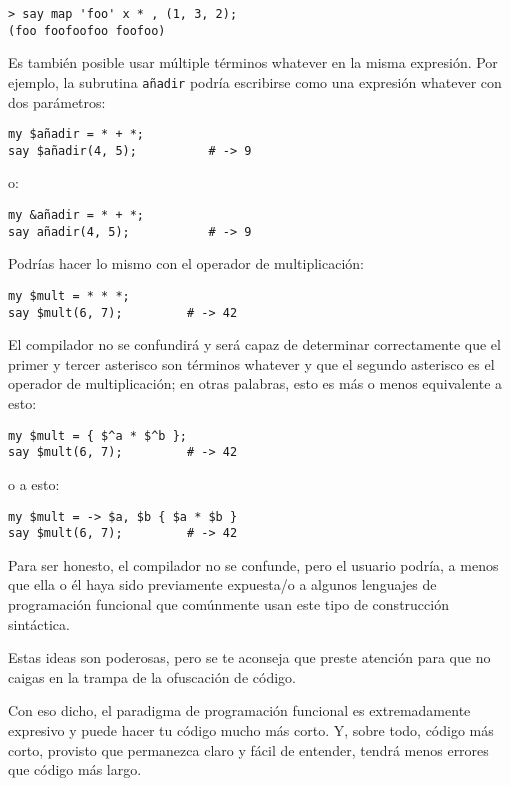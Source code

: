 \begin{verbatim}
> say map 'foo' x * , (1, 3, 2);
(foo foofoofoo foofoo)
\end{verbatim}

Es también posible usar múltiple términos whatever en la
misma expresión. Por ejemplo, la subrutina {\tt añadir}
podría escribirse como una expresión whatever con dos 
parámetros:

\begin{verbatim}
my $añadir = * + *;
say $añadir(4, 5);          # -> 9
\end{verbatim}

o:

\begin{verbatim}
my &añadir = * + *;
say añadir(4, 5);           # -> 9
\end{verbatim}

Podrías hacer lo mismo con el operador de multiplicación:

\begin{verbatim}
my $mult = * * *;
say $mult(6, 7);         # -> 42
\end{verbatim}

El compilador no se confundirá y será capaz de determinar
correctamente que el primer y tercer asterisco son
términos whatever y que el segundo asterisco es el operador
de multiplicación; en otras palabras, esto es más o menos 
equivalente a esto:

\begin{verbatim}
my $mult = { $^a * $^b };
say $mult(6, 7);         # -> 42
\end{verbatim}

o a esto:

\begin{verbatim}
my $mult = -> $a, $b { $a * $b }
say $mult(6, 7);         # -> 42  
\end{verbatim}

Para ser honesto, el compilador no se confunde, pero el 
usuario podría, a menos que ella o él haya sido previamente
expuesta/o a algunos lenguajes de programación funcional que
comúnmente usan este tipo de construcción sintáctica.

Estas ideas son poderosas, pero se te aconseja que preste atención
para que no caigas en la trampa de la ofuscación de código.

Con eso dicho, el paradigma de programación funcional es extremadamente
expresivo y puede hacer tu código mucho más corto. Y, sobre todo,
código más corto, provisto que permanezca claro y fácil de 
entender, tendrá menos errores que código más largo.


